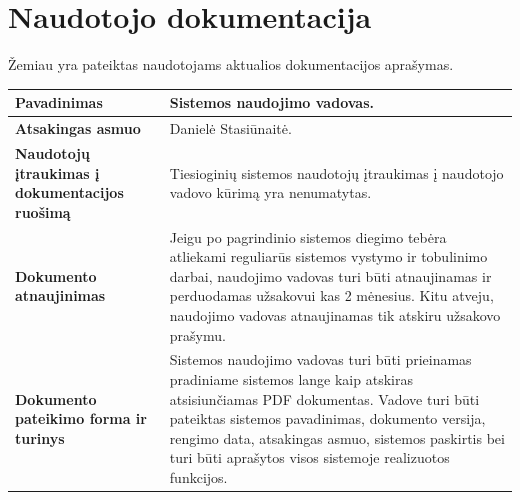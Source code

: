 \documentclass[12pt]{article}
\begin{document}
\section{Naudotojo dokumentacija}
Žemiau yra pateiktas naudotojams aktualios dokumentacijos aprašymas.

\begin{table}[htb!]
    \captionsetup{justification=centering}
    \begin{tabular}{|m{6cm}|m{10cm}|}
        \hline
        \raggedleft \textbf{\cellcolor{deepchampagne}Pavadinimas} &
        Sistemos naudojimo vadovas. \\
        \hline
        \raggedleft \textbf{\cellcolor{deepchampagne}Atsakingas asmuo} &
        Danielė Stasiūnaitė. \\
        \hline
        \raggedleft \textbf{\cellcolor{deepchampagne}Naudotojų įtraukimas į
        dokumentacijos ruošimą} & 
        Tiesioginių sistemos naudotojų įtraukimas į naudotojo vadovo kūrimą yra
        nenumatytas. \\
        \hline
        \raggedleft \textbf{\cellcolor{deepchampagne}Dokumento atnaujinimas} &
        Jeigu po pagrindinio sistemos diegimo tebėra atliekami reguliarūs
        sistemos vystymo ir tobulinimo darbai, naudojimo vadovas turi būti
        atnaujinamas ir perduodamas užsakovui kas 2 mėnesius. Kitu atveju,
        naudojimo vadovas atnaujinamas tik atskiru užsakovo prašymu. \\
        \hline
        \raggedleft \textbf{\cellcolor{deepchampagne}Dokumento pateikimo forma
        ir turinys} &
        Sistemos naudojimo vadovas turi būti prieinamas pradiniame sistemos
        lange kaip atskiras atsisiunčiamas PDF dokumentas. Vadove turi būti
        pateiktas sistemos pavadinimas, dokumento versija, rengimo data,
        atsakingas asmuo, sistemos paskirtis bei turi būti aprašytos visos
        sistemoje realizuotos funkcijos. \\
        \hline
    \end{tabular}
\end{table}




\end{document}
